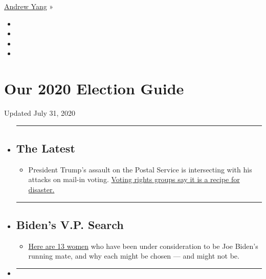 \href{https://www.nytimes.com/interactive/2020/us/elections/andrew-yang.html}{Andrew
Yang} »

\begin{itemize}
\item
\item
\item
\item
\end{itemize}

\hypertarget{our-2020-election-guide}{%
\section{Our 2020 Election Guide}\label{our-2020-election-guide}}

Updated July 31, 2020

\begin{itemize}
\item
  \begin{center}\rule{0.5\linewidth}{\linethickness}\end{center}

  \hypertarget{the-latest}{%
  \subsection{The Latest}\label{the-latest}}

  \begin{itemize}
  \tightlist
  \item
    President Trump's assault on the Postal Service is intersecting with
    his attacks on mail-in voting.
    \href{https://www.nytimes.com/2020/07/31/us/politics/trump-usps-mail-delays.html?action=click\&pgtype=Article\&state=default\&region=BELOW_MAIN_CONTENT\&context=storylines_guide}{Voting
    rights groups say it is a recipe for disaster.}
  \end{itemize}
\item
  \begin{center}\rule{0.5\linewidth}{\linethickness}\end{center}

  \hypertarget{bidens-vp-search}{%
  \subsection{Biden's V.P. Search}\label{bidens-vp-search}}

  \begin{itemize}
  \tightlist
  \item
    \href{https://www.nytimes.com/article/biden-vice-president-2020.html?action=click\&pgtype=Article\&state=default\&region=BELOW_MAIN_CONTENT\&context=storylines_guide}{Here
    are 13 women} who have been under consideration to be Joe Biden's
    running mate, and why each might be chosen --- and might not be.
  \end{itemize}
\item
  \begin{center}\rule{0.5\linewidth}{\linethickness}\end{center}


\end{itemize}
